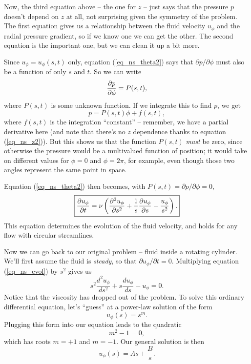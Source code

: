Now, the third equation above -- the one for $z$ -- just says that the pressure $p$ doesn't depend on $z$ at all, not surprising given the symmetry of the problem.  The first equation gives us a relationship between the fluid velocity $u_\phi$ and the radial pressure gradient, so if we know one we can get the other.  The second equation is the important one, but we can clean it up a bit more.  

Since $u_\phi = u_\phi(s, t)$ only, equation (\ref{eq_ns_theta2}) says that $\partial p / \partial \phi$ must also be a function of only $s$ and $t$.  So we can write
\[
\frac{\partial {p}}{\partial {\phi}} = P(s, t),
\]
where $P(s, t)$ is some unknown function.  If we integrate this to find $p$, we get
\[
p = P(s, t) \phi + f(s, t),
\]
where $f(s, t)$ is the integration ``constant'' -- remember, we have a partial derivative here (and note that there's no $z$ dependence thanks to equation (\ref{eq_ns_z2})).  But this shows us that the function $P(s, t)$ \emph{must} be zero, since otherwise the pressure would be a multivalued function of position; it would take on different values for $\phi = 0$ and $\phi = 2 \pi$, for example, even though those two angles represent the same point in space.

Equation (\ref{eq_ns_theta2}) then becomes, with $P(s, t) = \partial p / \partial \phi = 0$, 
\begin{equation}
\label{eq_ns_evol}
\boxed{
\frac{\partial {u_\phi}}{\partial {t}} =  \nu \left( \frac{\partial^2 {u_\phi}}{\partial {s}^2} + \frac{1}{s} \frac{\partial {u_\phi}}{\partial {s}} - \frac{u_\phi}{s^2} \right).
}
\end{equation}
This equation determines the evolution of the fluid velocity, and holds for any flow with circular streamlines.

Now we can go back to our original problem -- fluid inside a rotating cylinder.  We'll first assume the fluid is \emph{steady}, so that $\partial u_\phi / \partial t = 0$.  Multiplying equation (\ref{eq_ns_evol}) by $s^2$ gives us
\begin{equation}
\label{eq_spin_diffeq}
s^2 \frac{d^2 u_\phi}{ds^2} + s \frac{d u_\phi}{ds} - u_\phi = 0.
\end{equation}
Notice that the viscosity has dropped out of the problem.  To solve this ordinary differential equation, let's ``guess'' at a power-law solution of the form
\[
u_\phi(s) = s^m.
\]
Plugging this form into our equation leads to the quadratic 
\[
m^2 -1 = 0,
\]
which has roots $m = +1$ and $m = -1$.  Our general solution is then
\begin{equation}
\label{eq_cyl_steady_gen_sol}
u_\phi (s) = As + \frac{B}{s}.
\end{equation}


